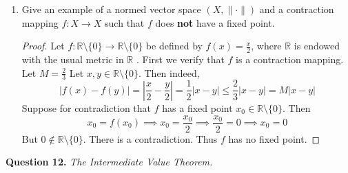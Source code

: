 \documentclass{article}
\theoremstyle{plain} %
\numberwithin{thm}{section} %
\theoremstyle{definition}
\begin{document}
\begin{enumerate}[label=(\alph*)]
        \item Give an example of a normed vector space $(X,\|\cdot\|)$ and a contraction mapping $f:X\rightarrow X$ such that $f$ does \textbf{not} have a fixed point.
        
        \begin{proof}
            Let \(f: \mathbb{R}\setminus \{0\} \to \mathbb{R}\setminus \{0\}\) be defined by \(f(x) = \frac{x}{2}\), where \(\mathbb{R}\) is endowed with the usual metric in \(\mathbb{R}\) . First we verify that \(f\) is a contraction mapping. Let \(M = \frac{2}{3}\) Let \(x,y \in \mathbb{R}\setminus\{0\}\). Then indeed,
            \[
                \left|f(x)-f(y)\right| = \left|\frac{x}{2} - \frac{y}{2}\right| = \frac{1}{2} \left|x - y\right| \leq \frac{2}{3} \left|x-y\right| = M\left|x-y\right|
            \]
            Suppose for contradiction that \(f\) has a fixed point \(x_0 \in \mathbb{R}\setminus\{0\}\).  Then
            \[
                x_0 = f(x_0) \implies x_0 = \frac{x_0}{2} \implies \frac{x_0}{2} = 0 \implies x_0 = 0
            \]
            But \(0 \notin \mathbb{R}\setminus\{0\}\). There is a contradiction. Thus \(f\) has no fixed point.

        \end{proof}
    \end{enumerate}
    \pagebreak
    \noindent\textbf{Question 12.} \textit{The Intermediate Value Theorem.}
\end{document}
